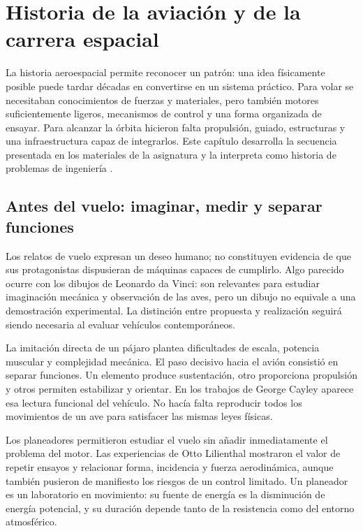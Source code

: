 \chapter{Historia de la aviación y de la carrera espacial}\label{ch:02}

La historia aeroespacial permite reconocer un patrón: una idea físicamente posible puede tardar décadas en convertirse en un sistema práctico. Para volar se necesitaban conocimientos de fuerzas y materiales, pero también motores suficientemente ligeros, mecanismos de control y una forma organizada de ensayar. Para alcanzar la órbita hicieron falta propulsión, guiado, estructuras y una infraestructura capaz de integrarlos. Este capítulo desarrolla la secuencia presentada en los materiales de la asignatura y la interpreta como historia de problemas de ingeniería \cite{TAE1}.

\section{Antes del vuelo: imaginar, medir y separar funciones}
Los relatos de vuelo expresan un deseo humano; no constituyen evidencia de que sus protagonistas dispusieran de máquinas capaces de cumplirlo. Algo parecido ocurre con los dibujos de Leonardo da Vinci: son relevantes para estudiar imaginación mecánica y observación de las aves, pero un dibujo no equivale a una demostración experimental. La distinción entre propuesta y realización seguirá siendo necesaria al evaluar vehículos contemporáneos.

La imitación directa de un pájaro plantea dificultades de escala, potencia muscular y complejidad mecánica. El paso decisivo hacia el avión consistió en separar funciones. Un elemento produce sustentación, otro proporciona propulsión y otros permiten estabilizar y orientar. En los trabajos de George Cayley aparece esa lectura funcional del vehículo. No hacía falta reproducir todos los movimientos de un ave para satisfacer las mismas leyes físicas.

Los planeadores permitieron estudiar el vuelo sin añadir inmediatamente el problema del motor. Las experiencias de Otto Lilienthal mostraron el valor de repetir ensayos y relacionar forma, incidencia y fuerza aerodinámica, aunque también pusieron de manifiesto los riesgos de un control limitado. Un planeador es un laboratorio en movimiento: su fuente de energía es la disminución de energía potencial, y su duración depende tanto de la resistencia como del entorno atmosférico.

